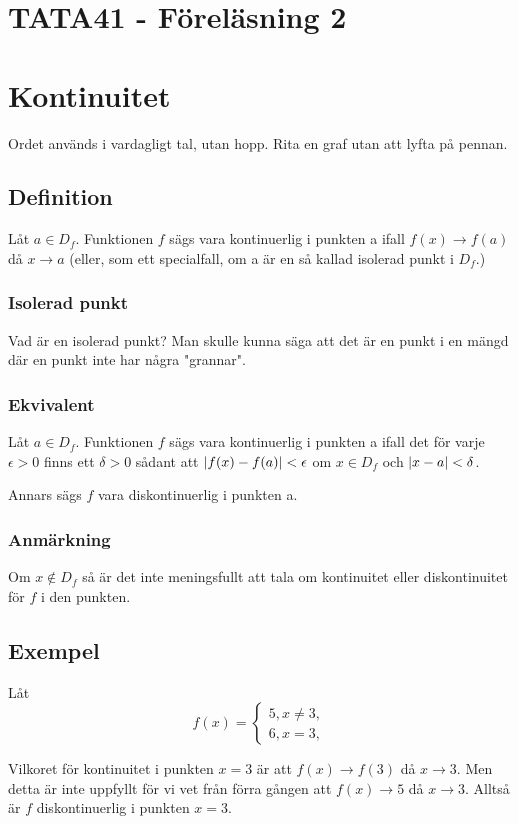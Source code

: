 \documentclass{article}
\begin{document}
\section{TATA41 - Föreläsning 2}
\section{Kontinuitet}
Ordet används i vardagligt tal, utan hopp.
Rita en graf utan att lyfta på pennan.

\subsection{Definition}
Låt $a\in D_f$. Funktionen $f$ sägs vara kontinuerlig i punkten a
ifall $f(x)\to f(a)$ då $x\to a$
(eller, som ett specialfall, om a är en så kallad isolerad punkt i $D_f$.)

\subsubsection{Isolerad punkt}
Vad är en isolerad punkt? Man skulle kunna säga att det är en punkt i en mängd där en punkt inte har några "grannar".
\subsubsection{Ekvivalent}
Låt $a\in D_f$. Funktionen $f$ sägs vara kontinuerlig i punkten a
ifall det för varje $\epsilon>0$ finns ett $\delta>0$ sådant att $\lvert f(x)-f(a)\rvert<\epsilon$ om $x\in D_f$ och $\lvert x-a\rvert<\delta$.

Annars sägs $f$ vara diskontinuerlig i punkten a.

\subsubsection{Anmärkning}
Om $x\notin D_f$ så är det inte meningsfullt att tala om kontinuitet eller diskontinuitet för $f$ i den punkten.

\subsection{Exempel}
Låt
$$
f(x)=
\begin{cases}
  5, x\neq 3,\\
  6, x=3,
\end{cases}
$$

Vilkoret för kontinuitet i punkten $x=3$ är att $f(x)\to f(3)$ då $x\to 3$.
Men detta är inte uppfyllt för vi vet från förra gången att $f(x)\to 5$ då $x\to 3$.
Alltså är $f$ diskontinuerlig i punkten $x=3$.
\end{document}
